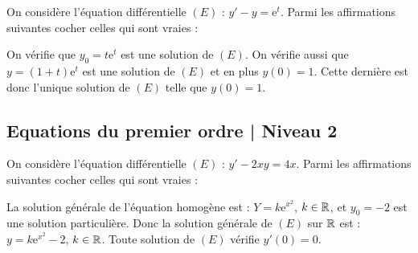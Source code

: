 \begin{question}
On considère l'équation différentielle $(E)$ : $y'-y=\mathrm{e}^t$. Parmi les affirmations suivantes cocher celles qui sont vraies :
\begin{answers}
\end{answers}
\begin{explanations}
On vérifie que $y_0=t\mathrm{e}^{t}$ est une solution de $(E)$. On vérifie aussi que $\displaystyle y=(1+t)\mathrm{e}^{t}$ est une solution de $(E)$ et en plus $y(0)=1$. Cette dernière est donc l'unique solution de $(E)$ telle que $y(0)=1$.
\end{explanations}
\end{question}

\subsection{Equations du premier ordre | Niveau 2}

\begin{question}
On considère l'équation différentielle $(E)$ : $\displaystyle y'-2xy=4x$.  Parmi les affirmations suivantes cocher celles qui sont vraies :
\begin{answers}  
\end{answers}
\begin{explanations}
La solution générale de l'équation homogène est : $Y=k\mathrm{e}^{x^2}$, $k\in \mathbb{R}$, et $y_0=-2$ est une solution particulière. Donc la solution générale de $(E)$ sur $\mathbb{R}$ est : $y=k\mathrm{e}^{x^2}-2$, $k\in \mathbb{R}$. Toute solution de $(E)$ vérifie $y'(0)=0$.
\end{explanations}
\end{question}

